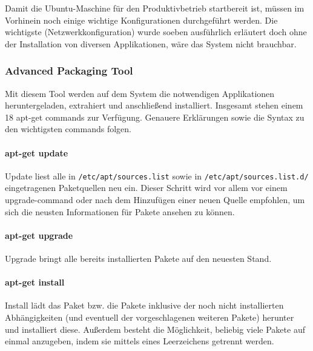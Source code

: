 Damit die Ubuntu-Maschine für den Produktivbetrieb startbereit ist,
müssen im Vorhinein noch einige wichtige Konfigurationen durchgeführt
werden. Die wichtigste (Netzwerkkonfiguration) wurde soeben ausführlich
erläutert doch ohne der Installation von diversen Applikationen, wäre
das System nicht brauchbar.

\hypertarget{advanced-packaging-tool}{%
\subsubsection{Advanced Packaging Tool}\label{advanced-packaging-tool}}

Mit diesem Tool werden auf dem System die notwendigen Applikationen
heruntergeladen, extrahiert und anschließend installiert. Insgesamt
stehen einem 18 apt-get commands zur Verfügung. Genauere Erklärungen
sowie die Syntax zu den wichtigsten commands folgen.

\hypertarget{apt-get-update}{%
\paragraph{apt-get update}\label{apt-get-update}}

Update liest alle in \texttt{/etc/apt/sources.list} sowie in
\texttt{/etc/apt/sources.list.d/} eingetragenen Paketquellen neu ein.
Dieser Schritt wird vor allem vor einem upgrade-command oder nach dem
Hinzufügen einer neuen Quelle empfohlen, um sich die neusten
Informationen für Pakete ansehen zu können.

\hypertarget{apt-get-upgrade}{%
\paragraph{apt-get upgrade}\label{apt-get-upgrade}}

Upgrade bringt alle bereits installierten Pakete auf den neuesten Stand.

\hypertarget{apt-get-install}{%
\paragraph{apt-get install}\label{apt-get-install}}

Install lädt das Paket bzw. die Pakete inklusive der noch nicht
installierten Abhängigkeiten (und eventuell der vorgeschlagenen weiteren
Pakete) herunter und installiert diese. Außerdem besteht die
Möglichkeit, beliebig viele Pakete auf einmal anzugeben, indem sie
mittels eines Leerzeichens getrennt werden.

